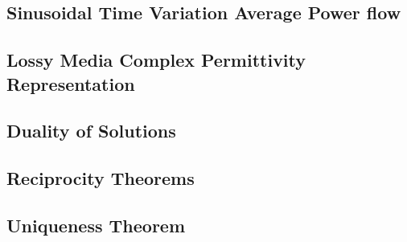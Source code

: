 \subsection{Sinusoidal Time Variation Average Power flow}
\subsection{Lossy Media Complex Permittivity Representation}
\subsection{Duality of Solutions}
\subsection{Reciprocity Theorems}
\subsection{Uniqueness Theorem}


